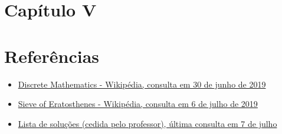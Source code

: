 \documentclass{article}
\begin{document}
\section{Capítulo V}

\section{Referências}
    \begin{itemize}
      \item \href{https://en.wikipedia.org/wiki/Discrete_mathematics}{Discrete Mathematics - Wikipédia, consulta em 30 de junho de 2019}
      \item \href{https://en.wikipedia.org/wiki/Sieve_of_Eratosthenes}{Sieve of Eratosthenes - Wikipédia, consulta em 6 de julho de 2019}
      \item \href{https://github.com/nayuki/Project-Euler-solutions/blob/master/Answers.txt}{Lista de soluções (cedida pelo professor), última consulta em 7 de julho}
    \end{itemize}
\end{document}
